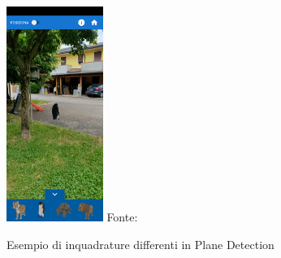 \documentclass[crop=false, class=book]{standalone}
\begin{document}
\begin{figure}
{				{\includegraphics[width=0.28\textwidth]{./resources/images/AnchorTrackable/pinglontano2.jpg}}
			}{Fonte: \url{}}	
			\caption{Esempio di inquadrature differenti in Plane Detection}
			\label{fig:augm_img}
	\end{figure}	
	\clearpage
	
\end{document}
